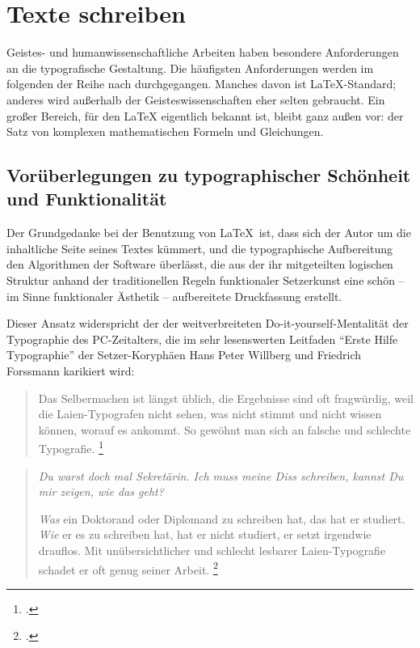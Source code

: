 
\chapter{Texte schreiben}

Geistes- und humanwissenschaftliche Arbeiten haben besondere Anforderungen an die typografische
Gestaltung. 
Die häufigsten Anforderungen werden im folgenden der Reihe nach durchgegangen.
Manches davon ist \LaTeX-Standard; anderes wird außerhalb der Geisteswissenschaften eher
selten gebraucht.
Ein großer Bereich, für den \LaTeX{} eigentlich bekannt ist, bleibt ganz außen vor:
der Satz von komplexen mathematischen Formeln und Gleichungen.


\section{Vorüberlegungen zu typographischer Schönheit und Funktionalität}


Der Grundgedanke bei der Benutzung von \LaTeX\ ist, dass sich der Autor um die inhaltliche Seite seines
Textes kümmert, und die typographische Aufbereitung den Algorithmen der Software überlässt, 
die aus der ihr mitgeteilten logischen Struktur anhand der traditionellen Regeln funktionaler Setzerkunst 
eine schön -- im Sinne funktionaler Ästhetik -- aufbereitete Druckfassung erstellt.

Dieser Ansatz widerspricht der der weitverbreiteten Do-it-yourself-Mentalität der Typographie des
PC-Zeitalters, die im sehr lesenswerten Leitfaden \enquote{Erste Hilfe Typographie} der Setzer-Koryphäen
Hans Peter Willberg und Friedrich Forssmann karikiert wird:

\begin{quote}
 Das Selbermachen ist längst üblich, die Ergebnisse sind oft fragwürdig,
 weil die Laien-Typografen nicht sehen, was nicht stimmt und nicht wissen
 können, worauf es ankommt.
 So gewöhnt man sich an falsche und schlechte Typografie.
 \footcite[9]{erste_hilfe}
 \end{quote}
 
\begin{quotation}
 \emph{Du warst doch mal Sekretärin.
 Ich muss meine Diss schreiben, kannst Du mir zeigen, wie das geht?}
 
 \emph{Was} ein Doktorand oder Diplomand zu schreiben hat, das hat er studiert.
 \emph{Wie} er es zu schreiben hat, hat er nicht studiert, er setzt irgendwie drauflos.
 Mit unübersichtlicher und schlecht lesbarer Laien-Typografie schadet er oft genug seiner Arbeit.
 \footcite[86]{erste_hilfe}
\end{quotation}

